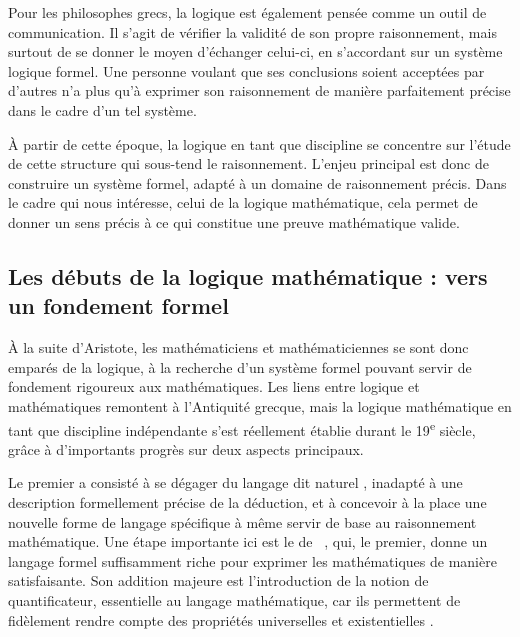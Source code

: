 Pour les philosophes grecs,
la logique est également pensée comme un outil de communication.
Il s’agit de vérifier la validité de son propre raisonnement,
mais surtout de se donner le moyen d’échanger celui-ci,
en s’accordant sur un système logique formel.%
Une personne voulant que ses conclusions soient acceptées par d’autres n’a plus qu’à
exprimer son raisonnement de manière parfaitement précise dans le cadre d’un tel système.

À partir de cette époque, la logique en tant que discipline se concentre sur l’étude
de cette structure qui sous-tend le raisonnement.
L’enjeu principal est donc de construire un système formel,
adapté à un domaine de raisonnement précis. Dans le cadre qui nous intéresse,
celui de la logique mathématique, cela permet de donner un sens précis à
ce qui constitue une preuve mathématique valide.

\subsection{Les débuts de la logique mathématique : vers un fondement formel}

À la suite d’Aristote, les mathématiciens et mathématiciennes se sont donc emparés
de la logique, à la recherche d’un système formel
pouvant servir de fondement rigoureux aux mathématiques.
Les liens entre logique et mathématiques remontent à l’Antiquité grecque,
mais la logique mathématique en tant que discipline indépendante s’est réellement établie
durant le 19\textsuperscript{e} siècle, grâce à d’importants progrès
sur deux aspects principaux.

Le premier a consisté à se dégager du langage dit
naturel%
, inadapté à une description formellement précise de la déduction, et à
concevoir à la place une nouvelle forme de langage spécifique à même servir de
base au raisonnement mathématique.
Une étape importante ici est le  de
\citeauthor{Begriffsschrift}~,
qui, le premier, donne un langage formel suffisamment riche pour exprimer les mathématiques
de manière satisfaisante. Son addition majeure est l’introduction
de la notion de quantificateur, essentielle au langage mathématique,
car ils permettent de fidèlement rendre compte des propriétés universelles%
et existentielles%
.

